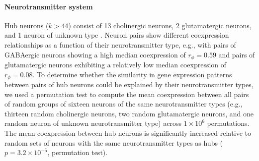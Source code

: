 \documentclass[10pt,letterpaper]{article}
\begin{document}




\paragraph{Neurotransmitter system}
Hub neurons ($k > 44$) consist of 13 cholinergic neurons, 2 glutamatergic neurons, and 1 neuron of unknown type \cite{Pereira:2015er}.
Neuron pairs show different coexpression relationships as a function of their neurotransmitter type, e.g., with pairs of GABAergic neurons showing a high median coexpression of $r_\phi = 0.59$ and pairs of glutamatergic neurons exhibiting a relatively low median coexpression of $r_\phi = 0.08$.
To determine whether the similarity in gene expression patterns between pairs of hub neurons could be explained by their neurotransmitter types, we used a permutation test to compute the mean coexpression between all pairs of random groups of sixteen neurons of the same neurotransmitter types (e.g., thirteen random cholinergic neurons, two random glutamatergic neurons, and one random neuron of unknown neurotransmitter type) across $1\times 10^6$ permutations.
The mean coexpression between hub neurons is significantly increased relative to random sets of neurons with the same neurotransmitter types as hubs ($p = 3.2\times 10^{-5}$, permutation test).
\end{document}
